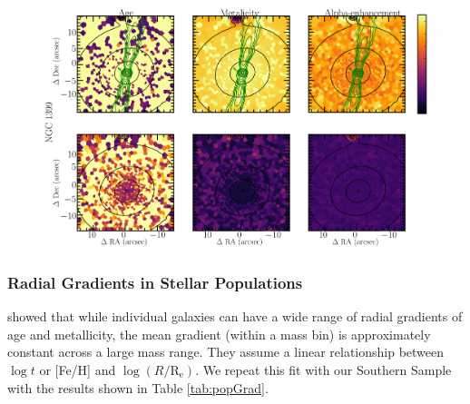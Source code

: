		\begin{figure}
			\centering
			\includegraphics[height=0.31\textheight]{chapter4/muse/pop2.png}
		\end{figure}


		\subsubsection{Radial Gradients in Stellar Populations}
			\label{subsubsec:popGrad}

			\citet{Koleva2011} showed that while individual galaxies can have a wide range of radial gradients of age and metallicity, the mean gradient (within a mass bin) is approximately constant across a large mass range. They assume a linear relationship between $\log t$ or [Fe/H] and $\log (R/\mathrm{R_e})$. We repeat this fit with our Southern Sample with the results shown in Table \ref{tab:popGrad}. 

